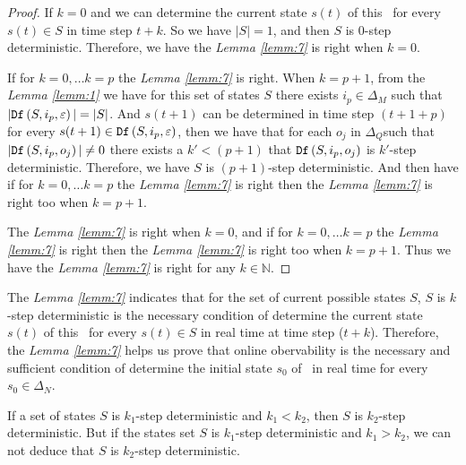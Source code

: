 \begin{proof}
If $k=0$ and we can determine the current state $s(t)$ of this \BCN\ for every $s(t)\in S$ in time step $t+k$. So we have $|S|=1$, and then $S$ is $0$-step deterministic. Therefore, we have the {\em Lemma \ref{lemm:7}} is right when $k=0$. 

If for $k=0,\ldots k=p$ the {\em Lemma \ref{lemm:7}} is right. When $k=p+1$, from the {\em Lemma \ref{lemm:1}} we have for this set of states $S$ there exists $i_p \in \Delta_M$ such that $|{\tt Df}\left(S,i_p,\varepsilon\right)|=|S|$. And $s(t+1)$ can be determined in time step $(t+1+p)$ for every $s(t+1)\in {\tt Df}\left(S,i_p,\varepsilon\right)$, then we have that for each $o_j$ in $\Delta_Q$such that $|{\tt Df}\left(S,i_p,o_j\right)|\neq 0$ there exists a ${k'}<(p+1)$ that ${\tt Df}\left(S,i_p,o_j\right)$ is $k'$-step deterministic.
Therefore, we have $S$ is $(p+1)$-step deterministic. And then have if for $k=0,\ldots k=p$ the {\em Lemma \ref{lemm:7}} is right then the {\em Lemma \ref{lemm:7}} is right too when $k=p+1$. 

The {\em Lemma \ref{lemm:7}} is right when $k=0$, and if for $k=0,\ldots k=p$ the {\em Lemma \ref{lemm:7}} is right then the {\em Lemma \ref{lemm:7}} is right too when $k=p+1$. Thus we have the {\em Lemma \ref{lemm:7}} is right for any $k\in \mathbb{N}$.
\end{proof}

The {\em Lemma \ref{lemm:7}} indicates that for the set of current possible states $S$, $S$ is $k$-step deterministic is the necessary condition of determine the current state $s(t)$ of this \BCN\ for every $s(t)\in S$ in real time at time step ($t+k$). Therefore, the {\em Lemma \ref{lemm:7}} helps us prove that online obervability is the necessary and sufficient condition of determine the initial state $s_0$ of \BCNs\ in real time for every $s_0\in \Delta_N$.
\begin{lemma}
 If a set of states $S$ is $k_1$-step deterministic and $k_1< k_2$, then $S$ is $k_2$-step deterministic. But if the states set $S$ is $k_1$-step deterministic and $k_1> k_2$, we can not deduce that $S$ is $k_2$-step deterministic. 
  \label{lemm:2}
\end{lemma}

